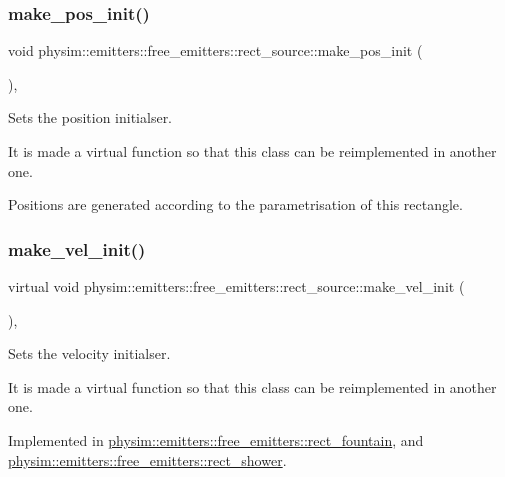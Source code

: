 \subsubsection{\texorpdfstring{make\+\_\+pos\+\_\+init()}{make\_pos\_init()}}
{\footnotesize\ttfamily void physim\+::emitters\+::free\+\_\+emitters\+::rect\+\_\+source\+::make\+\_\+pos\+\_\+init (\begin{DoxyParamCaption}{ }\end{DoxyParamCaption})\hspace{0.3cm}{\ttfamily [protected]}, {\ttfamily [virtual]}}



Sets the position initialser. 

It is made a virtual function so that this class can be reimplemented in another one.

Positions are generated according to the parametrisation of this rectangle. \mbox{\label{classphysim_1_1emitters_1_1free__emitters_1_1rect__source_aace4d8f596f2a138e098ab0f86e927b5}} 
\subsubsection{\texorpdfstring{make\+\_\+vel\+\_\+init()}{make\_vel\_init()}}
{\footnotesize\ttfamily virtual void physim\+::emitters\+::free\+\_\+emitters\+::rect\+\_\+source\+::make\+\_\+vel\+\_\+init (\begin{DoxyParamCaption}{ }\end{DoxyParamCaption})\hspace{0.3cm}{\ttfamily [protected]}, {}}



Sets the velocity initialser. 

It is made a virtual function so that this class can be reimplemented in another one. 

Implemented in \hyperlink{classphysim_1_1emitters_1_1free__emitters_1_1rect__fountain_a86c3d792fa977ef2b97785abced613ae}{physim\+::emitters\+::free\+\_\+emitters\+::rect\+\_\+fountain}, and \hyperlink{classphysim_1_1emitters_1_1free__emitters_1_1rect__shower_ab1c7c992c636e3a15e70d6ce3180ed70}{physim\+::emitters\+::free\+\_\+emitters\+::rect\+\_\+shower}.

